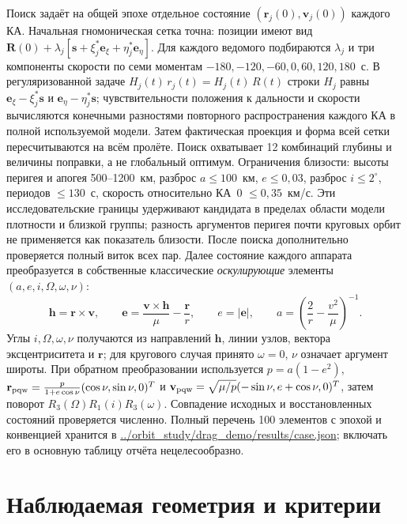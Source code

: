 \documentclass[a4paper,12pt]{article}
\begin{document}
Поиск задаёт на общей эпохе отдельное состояние
$(\mathbf r_j(0),\mathbf v_j(0))$ каждого КА. Начальная
гномоническая сетка точна: позиции имеют вид
$\mathbf R(0)+\lambda_j[\mathbf s+\xi_j^*\mathbf e_\xi+
\eta_j^*\mathbf e_\eta]$. Для каждого ведомого подбираются
$\lambda_j$ и три компоненты скорости по семи моментам
$-180,-120,-60,0,60,120,180$~с. В регуляризованной задаче
$H_j(t)\,r_j(t)=H_j(t)\,R(t)$ строки $H_j$ равны
$\mathbf e_\xi-\xi_j^*\mathbf s$ и
$\mathbf e_\eta-\eta_j^*\mathbf s$; чувствительности
положения к дальности и скорости вычисляются конечными
разностями повторного распространения каждого КА в полной
используемой модели. Затем фактическая проекция и форма всей
сетки пересчитываются на всём пролёте. Поиск охватывает 12
комбинаций глубины и величины поправки, а не глобальный оптимум.
Ограничения близости: высоты перигея и апогея 500--1200~км,
разброс $a\leq100$~км, $e\leq0{,}03$,
разброс $i\leq2^\circ$, периодов $\leq130$~с,
скорость относительно КА~0 $\leq0{,}35$~км/с. Эти
исследовательские границы удерживают кандидата в пределах
области модели плотности и близкой группы; разность аргументов
перигея почти круговых орбит не применяется как показатель близости.
После поиска дополнительно проверяется полный виток всех пар.
Далее состояние каждого аппарата преобразуется
в собственные классические \emph{оскулирующие} элементы
$(a,e,i,\Omega,\omega,\nu)$:
\begin{equation}
 \mathbf h=\mathbf r\times\mathbf v,\qquad
 \mathbf e=\frac{\mathbf v\times\mathbf h}{\mu}-\frac{\mathbf r}{r},
 \qquad e=|\mathbf e|,\qquad
 a=\left(\frac2r-\frac{v^2}{\mu}\right)^{-1}.
 \label{eq:elements}
\end{equation}
Углы $i,\Omega,\omega,\nu$ получаются из направлений
$\mathbf h$, линии узлов, вектора эксцентриситета и $\mathbf r$;
для кругового случая принято $\omega=0$, $\nu$ означает аргумент
широты. При обратном преобразовании используется
$p=a(1-e^2)$, $\mathbf r_{\rm pqw}=
\frac{p}{1+e\cos\nu}(\cos\nu,\sin\nu,0)^T$ и
$\mathbf v_{\rm pqw}=\sqrt{\mu/p}(-\sin\nu,e+\cos\nu,0)^T$,
затем поворот $R_3(\Omega)R_1(i)R_3(\omega)$. Совпадение исходных
и восстановленных состояний проверяется численно. Полный перечень
100 элементов с эпохой и конвенцией хранится в
\url{../orbit_study/drag_demo/results/case.json}; включать
его в основную таблицу отчёта нецелесообразно.

\section{Наблюдаемая геометрия и критерии}
\end{document}

